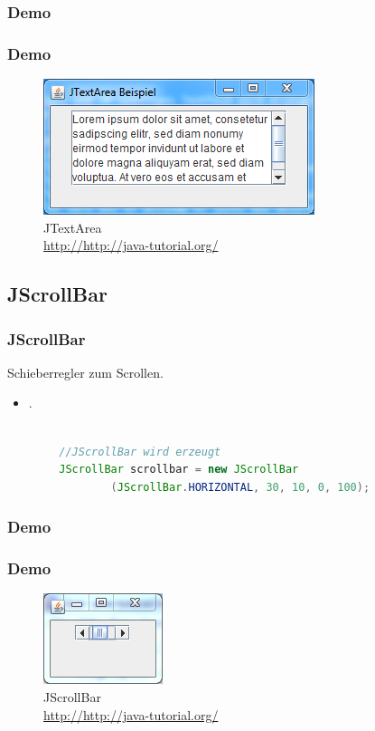 \documentclass[xcolor=dvipsnames]{beamer}
\begin{document}
\subsubsection{Demo}
\begin{frame}
  \frametitle{Demo}
	\begin{figure}
		\includegraphics[scale=1.0]{images/jtextarea.PNG}
		\caption{JTextArea \\ \tiny{\textcolor{gray}{\url{http://http://java-tutorial.org/}}}}
		\end{figure}
\end{frame}


\subsection{JScrollBar}
\begin{frame}  %
  \frametitle{JScrollBar
} %
  \begin{block}{Schieberregler zum Scrollen.}
	  \begin{itemize}
		\item .
	  \end{itemize}
  \end{block}

\begin{lstlisting}[language=java,basicstyle=\scriptsize\ttfamily]

        //JScrollBar wird erzeugt
        JScrollBar scrollbar = new JScrollBar
                (JScrollBar.HORIZONTAL, 30, 10, 0, 100);

\end{lstlisting}

\end{frame}


\subsubsection{Demo}
\begin{frame}
  \frametitle{Demo}
	\begin{figure}
		\includegraphics[scale=1.0]{images/jscrollbar.PNG}
		\caption{JScrollBar \\ \tiny{\textcolor{gray}{\url{http://http://java-tutorial.org/}}}}
		\end{figure}
\end{frame}
\end{document}
